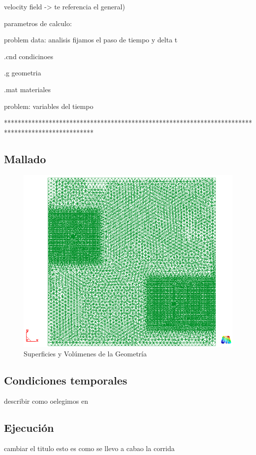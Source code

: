 \documentclass[10pt,a4paper,final]{article}
\begin{document}
velocity field -> te referencia el general)
	
	parametros de calculo:
	
	problem data: analisis fijamos el paso de tiempo y delta t
	
	.cnd condicinoes
	
	.g geometria
	
	.mat materiales
	
	problem: variables del tiempo
	
**************************************************************************************************
%
\subsection{Mallado}

\begin{figure}[tbhp]
\centerline{\includegraphics[scale=0.75]{img/contorno_malla_xy}}
\caption{Superficies y Volúmenes de la Geometría}
\label{contorno_malla_xy}
\end{figure}
%
\subsection{Condiciones temporales}
describir como oelegimos en
%
%
\subsection{Ejecución}
cambiar el titulo esto es como se llevo a cabao la corrida
\end{document}
